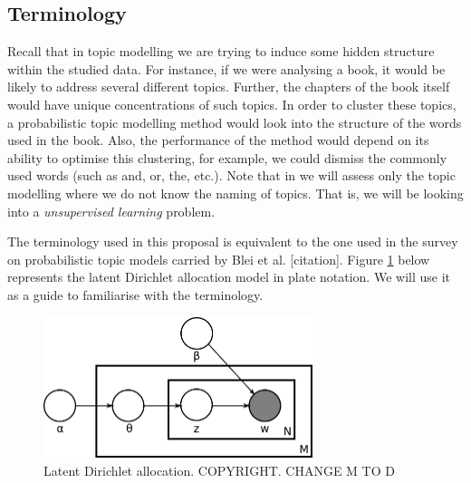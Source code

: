\documentclass{mprop}
\begin{document}
\subsection{Terminology}

\par Recall that in topic modelling we are trying to induce some hidden structure within the studied data. For instance, if we were analysing a book, it would be likely to address several different topics. Further, the chapters of the book itself would have unique concentrations of such topics. In order to cluster these topics, a probabilistic topic modelling method would look into the structure of the words used in the book. Also, the performance of the method would depend on its ability to optimise this clustering, for example, we could dismiss the commonly used words (such as and, or, the, etc.). Note that in we will assess only the topic modelling where we do not know the naming of topics. That is, we will be looking into a \textit{unsupervised learning} problem.

\par The terminology used in this proposal is equivalent to the one used in the survey on probabilistic topic models carried by Blei et al. [citation]. Figure \ref{fig:lda} below represents the latent Dirichlet allocation model in plate notation. We will use it as a guide to familiarise with the terminology.   
\begin{figure}[H]
  \centering
  \includegraphics[width=0.7\textwidth]{lda}
  \caption{Latent Dirichlet allocation. COPYRIGHT. CHANGE M TO D}
  \label{fig:lda}
\end{figure}
\end{document}
